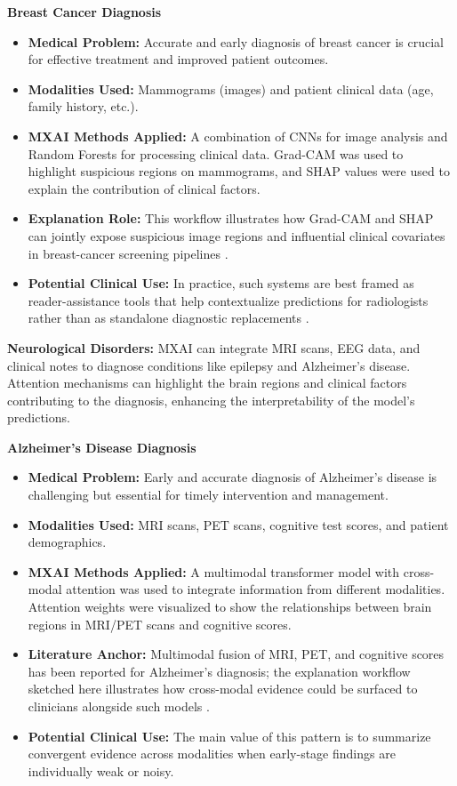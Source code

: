 \documentclass[pdflatex,sn-mathphys-num]{sn-jnl}%
\theoremstyle{thmstyleone}%
\theoremstyle{thmstyletwo}%
\theoremstyle{thmstylethree}%
\begin{document}
\begin{itemize}
    \textbf{Breast Cancer Diagnosis}
    \begin{itemize}
        \item \textbf{Medical Problem:} Accurate and early diagnosis of breast cancer is crucial for effective treatment and improved patient outcomes.
        \item \textbf{Modalities Used:} Mammograms (images) and patient clinical data (age, family history, etc.).
        \item \textbf{MXAI Methods Applied:} A combination of CNNs for image analysis and Random Forests for processing clinical data. Grad-CAM was used to highlight suspicious regions on mammograms, and SHAP values were used to explain the contribution of clinical factors.
        \item \textbf{Explanation Role:} This workflow illustrates how Grad-CAM and SHAP can jointly expose suspicious image regions and influential clinical covariates in breast-cancer screening pipelines \cite{Bai_2025}.
        \item \textbf{Potential Clinical Use:} In practice, such systems are best framed as reader-assistance tools that help contextualize predictions for radiologists rather than as standalone diagnostic replacements \cite{Bai_2025}.
    \end{itemize}

     \textbf{Neurological Disorders:} MXAI can integrate MRI scans, EEG data, and clinical notes to diagnose conditions like epilepsy and Alzheimer's disease. Attention mechanisms can highlight the brain regions and clinical factors contributing to the diagnosis, enhancing the interpretability of the model's predictions.
    
    \textbf{Alzheimer's Disease Diagnosis}
    \begin{itemize}
        \item \textbf{Medical Problem:} Early and accurate diagnosis of Alzheimer's disease is challenging but essential for timely intervention and management.
        \item \textbf{Modalities Used:} MRI scans, PET scans, cognitive test scores, and patient demographics.
        \item \textbf{MXAI Methods Applied:} A multimodal transformer model with cross-modal attention was used to integrate information from different modalities. Attention weights were visualized to show the relationships between brain regions in MRI/PET scans and cognitive scores.
        \item \textbf{Literature Anchor:} Multimodal fusion of MRI, PET, and cognitive scores has been reported for Alzheimer's diagnosis; the explanation workflow sketched here illustrates how cross-modal evidence could be surfaced to clinicians alongside such models \cite{SUK2014569}.
        \item \textbf{Potential Clinical Use:} The main value of this pattern is to summarize convergent evidence across modalities when early-stage findings are individually weak or noisy.
    \end{itemize}


\end{itemize}
\end{document}
